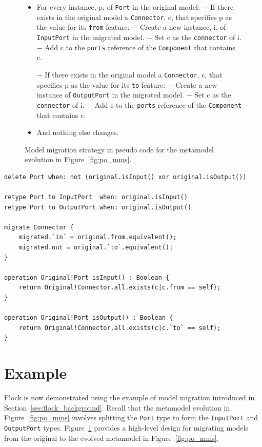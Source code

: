 \begin{figure}[tbp]
	\begin{framed}
		\footnotesize
		\begin{itemize}
			\item For every instance, p, of \texttt{Port} in the original model: 
			\subitem $-$ If there exists in the original model a \texttt{Connector}, c, that specifies p as the value for its \texttt{from} feature:
			\subsubitem $-$ Create a new instance, i, of \texttt{InputPort} in the migrated model.
			\subsubitem $-$ Set c as the \texttt{connector} of i.
			\subsubitem $-$ Add c to the \texttt{ports} reference of the \texttt{Component} that contains c.
	
			\subitem $-$ If there exists in the original model a \texttt{Connector}, c, that specifies p as the value for its \texttt{to} feature:
			\subsubitem $-$ Create a new instance of \texttt{OutputPort} in the migrated model.
			\subsubitem $-$ Set c as the \texttt{connector} of i.
			\subsubitem $-$ Add c to the \texttt{ports} reference of the \texttt{Component} that contains c.

			\item And nothing else changes.
		\end{itemize}
	\end{framed}
	\caption{Model migration strategy in pseudo code for the metamodel evolution in Figure~\ref{fig:po_mms}.}
	\label{fig:po_migration_strategy}
\end{figure}

\begin{lstlisting}[caption=Flock migration strategy for the process-oriented metamodel evolution in Figure~\ref{fig:po_mms}, label=lst:flock, language=Flock]
delete Port when: not (original.isInput() xor original.isOutput())

retype Port to InputPort  when: original.isInput()
retype Port to OutputPort when: original.isOutput()

migrate Connector {
	migrated.`in` = original.from.equivalent();
	migrated.out = original.`to`.equivalent();
}

operation Original!Port isInput() : Boolean {
	return Original!Connector.all.exists(c|c.from == self);
}

operation Original!Port isOutput() : Boolean {
	return Original!Connector.all.exists(c|c.`to` == self);
}
\end{lstlisting}

\section{Example}
Flock is now demonstrated using the example of model migration introduced in Section~\ref{sec:flock_background}. Recall that the metamodel evolution in Figure~\ref{fig:po_mms} involves splitting the \texttt{Po\-rt} type to form the \texttt{In\-p\-utPo\-rt} and \texttt{Ou\-tp\-utPo\-rt} types. Figure~\ref{fig:po_migration_strategy} provides a high-level design for migrating models from the original to the evolved metamodel in Figure~\ref{fig:po_mms}.


